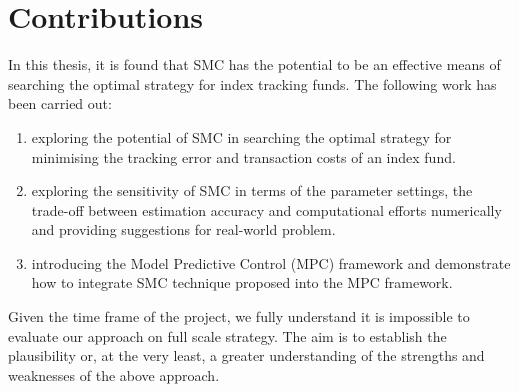 \section{Contributions}
In this thesis, it is found that SMC has the potential to be an effective means of searching the optimal strategy for index tracking funds. The following work has been carried out:
\begin{enumerate}
\item exploring the potential of SMC in searching the optimal strategy for minimising the tracking error and transaction costs of an index fund. 
\item exploring the sensitivity of SMC in terms of the parameter settings, the trade-off between estimation accuracy and computational efforts numerically and providing suggestions for real-world problem.
\item introducing the Model Predictive Control (MPC) framework and demonstrate how to integrate SMC technique proposed into the MPC framework.
\end{enumerate}

Given the time frame of the project, we fully understand it is impossible to evaluate our approach on full scale strategy. The aim is to establish the plausibility or, at the very least, a greater understanding of the strengths and weaknesses of the above approach.

